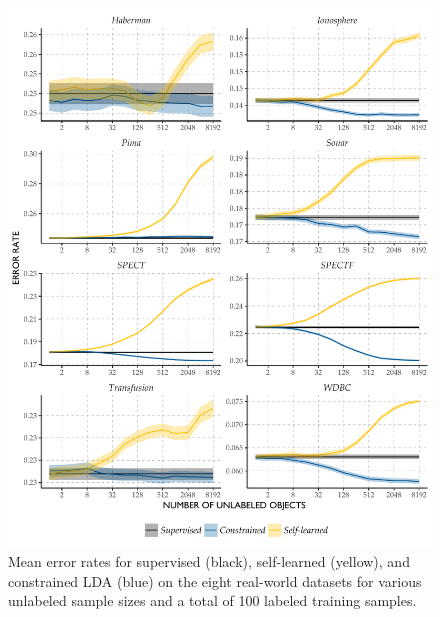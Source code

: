 \documentclass[twoside]{memoir}\usepackage[]{graphicx}\usepackage{xcolor}
\makeatletter
\def\maxwidth{ %
  \ifdim\Gin@nat@width>\linewidth
    \linewidth
  \else
    \Gin@nat@width
  \fi
}
\newenvironment{knitrout}{}{} %
\makeatother
\begin{document}
\begin{knitrout}
\color{fgcolor}\begin{figure}
\includegraphics[width=\maxwidth]{figure/five-1} \caption[Mean error rates for supervised (black), self-learned (yellow), and constrained LDA (blue) on the eight real-world datasets for various unlabeled sample sizes and a total of 100 labeled training samples]{Mean error rates for supervised (black), self-learned (yellow), and constrained LDA (blue) on the eight real-world datasets for various unlabeled sample sizes and a total of 100 labeled training samples.}\label{fig:five}
\end{figure}


\end{knitrout}
\end{document}
